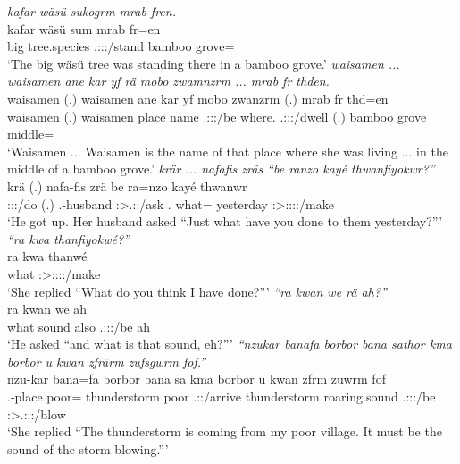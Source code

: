 \begin{exe}
	\emph{kafar wäsü sukogrm mrab fren.}\\
	\gll kafar wäsü sum mrab fr=en\\
	big {tree.species} \Tsg.\Masc:\Sbj:\Pst:\Dur/stand bamboo grove=\Loc\\
	\trans `The big wäsü tree was standing there in a bamboo grove.'
	\emph{waisamen ... waisamen ane kar yf rä mobo zwamnzrm ... mrab fr thden.}\\
	\gll waisamen (.) waisamen ane kar yf  mobo zwanzrm (.) mrab fr thd=en\\
	waisamen (.) waisamen {\Dem} place name \Tsg.\F:\Sbj:\Nonpast:\Ipfv/be where.{\All} \Tsg.\F:\Sbj:\Pst:\Dur/dwell (.) bamboo grove middle={\Loc}\\
	\trans `Waisamen ... Waisamen is the name of that place where she was living ... in the middle of a bamboo grove.'
	\emph{krär ... nafafis zräs ``be ranzo kayé thwanfiyokwr?''}\\
	\gll krä (.) nafa-fis zrä be ra=nzo kayé thwanwr\\
	\Stsg:\Sbj:\Irr:\Pfv/do (.) \Third.\Poss-husband \Stsg:\Sbj>\Tsg.\F:\Irr:\Pfv/ask \Ssg.{\Erg} what={\Only} yesterday \Stsg:\Sbj>\Stpl:\Obj:\Rpst:\Ipfv:\Venit/make\\
	\trans `He got up. Her husband asked ``Just what have you done to them yesterday?'''
	\emph{``ra kwa thanfiyokwé?'' }\\
	\gll ra kwa thanwé\\
	what {\Fut} \Fsg:\Sbj>\Stpl:\Obj:\Rpst:\Ipfv:\Venit/make\\
	\trans `She replied ``What do you think I have done?'''
	\emph{``ra kwan we rä ah?''}\\
	\gll ra kwan we  ah\\
	what sound also \Tsg.\F:\Sbj:\Nonpast:\Ipfv/be ah\\
	\trans `He asked ``and what is that sound, eh?'''
	\emph{``nzukar banafa borbor bana sathor kma borbor u kwan zfrärm zufsgwrm fof.''}\\
	\gll nzu-kar bana=fa borbor bana sa kma borbor {u kwan} zfrm zuwrm fof\\
	\Fsg.\Poss-place poor={\Abl} thunderstorm poor \Tsg.\Masc:\Rpst:\Pfv/arrive {\Pot} thunderstorm {roaring.sound} \Tsg.\F:\Sbj:\Pst:\Dur/be \Sg:\Sbj>\Tsg.\F:\Obj:\Pst:\Dur/blow \Emph\\
	\trans `She replied ``The thunderstorm is coming from my poor village. It must be the sound of the storm blowing.'''

\end{exe}
